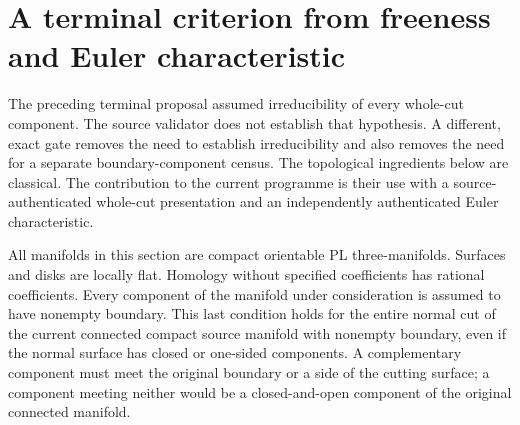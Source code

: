 
\section{A terminal criterion from freeness and Euler characteristic}
\label{sec:free-euler-terminal}

The preceding terminal proposal assumed irreducibility of every whole-cut
component.  The source validator does not establish that hypothesis.  A
different, exact gate removes the need to establish irreducibility and
also removes the need for a separate boundary-component census.  The
topological ingredients below are classical.  The contribution to the
current programme is their use with a source-authenticated whole-cut
presentation and an independently authenticated Euler characteristic.

All manifolds in this section are compact orientable PL three-manifolds.
Surfaces and disks are locally flat.  Homology without specified
coefficients has rational coefficients.  Every component of the manifold
under consideration is assumed to have nonempty boundary.  This last
condition holds for the entire normal cut of the current connected
compact source manifold with nonempty boundary, even if the normal
surface has closed or one-sided components.  A complementary component
must meet the original boundary or a side of the cutting surface; a
component meeting neither would be a closed-and-open component of the
original connected manifold.

